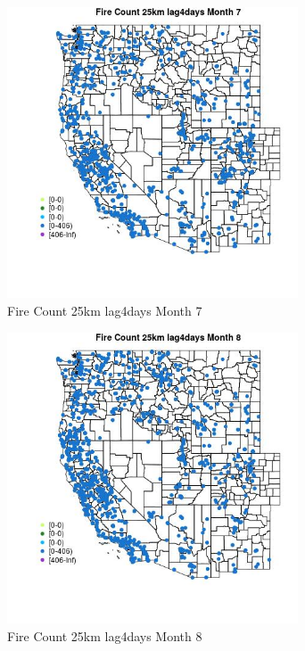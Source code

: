 \begin{figure} 
\centering  
\includegraphics[width=0.77\textwidth]{Code_Outputs/Report_ML_input_PM25_Step4_part_f_de_duplicated_aves_prioritize_24hr_obswNAs_MapObsMo7Fire_Count_25km_lag4days.jpg} 
\caption{\label{fig:Report_ML_input_PM25_Step4_part_f_de_duplicated_aves_prioritize_24hr_obswNAsMapObsMo7Fire_Count_25km_lag4days}Fire Count 25km lag4days Month 7} 
\end{figure} 
 

\begin{figure} 
\centering  
\includegraphics[width=0.77\textwidth]{Code_Outputs/Report_ML_input_PM25_Step4_part_f_de_duplicated_aves_prioritize_24hr_obswNAs_MapObsMo8Fire_Count_25km_lag4days.jpg} 
\caption{\label{fig:Report_ML_input_PM25_Step4_part_f_de_duplicated_aves_prioritize_24hr_obswNAsMapObsMo8Fire_Count_25km_lag4days}Fire Count 25km lag4days Month 8} 
\end{figure} 
 


